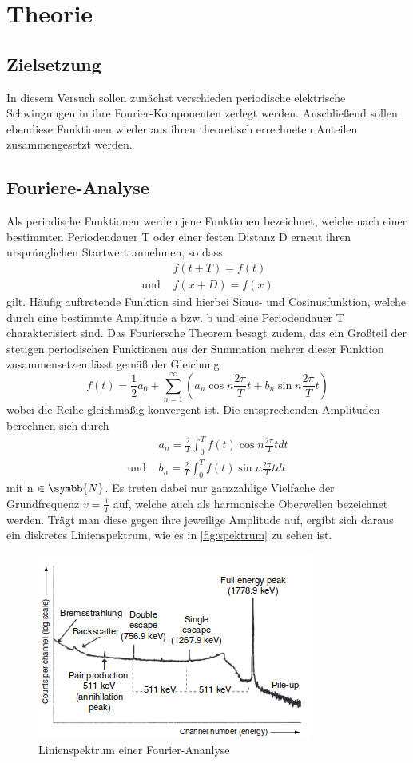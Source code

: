 \section{Theorie}
\label{sec:Theorie}
\subsection{Zielsetzung}
In diesem Versuch sollen zunächst verschieden periodische elektrische
Schwingungen in ihre Fourier-Komponenten zerlegt werden. Anschließend sollen
ebendiese Funktionen wieder aus ihren theoretisch errechneten Anteilen
zusammengesetzt werden.

\subsection{Fouriere-Analyse}
Als periodische Funktionen werden jene Funktionen bezeichnet, welche nach
einer bestimmten Periodendauer T oder einer festen Distanz D erneut ihren
ursprünglichen Startwert annehmen, so dass
\begin{align}
  & f(t+T)=f(t) \\
  \text{und    }      & f(x+D)=f(x)
  \label{eqn:period}
\end{align}
gilt. Häufig auftretende Funktion sind hierbei Sinus- und Cosinusfunktion,
welche durch eine bestimmte Amplitude a bzw. b und eine Periodendauer T
charakterisiert sind.
Das Fouriersche Theorem besagt zudem, das ein Großteil der stetigen periodischen
Funktionen aus der Summation mehrer dieser Funktion zusammensetzen lässt gemäß
der Gleichung
\begin{equation}
   f(t)= \frac{1}{2}a_0 + \sum_{n=1}^\infty (a_n \cos n \frac{2 \pi}{T}t
   + b_n \sin n \frac{2 \pi}{T}t)
\end{equation}
wobei die Reihe gleichmäßig konvergent ist. Die entsprechenden Amplituden
berechnen sich durch
\begin{align}
  & a_n = \frac{2}{T} \int_0^T f(t) \cos n \frac{2 \pi}{T}t dt \\
  \text{und    }     & b_n = \frac{2}{T} \int_0^T f(t) \sin n \frac{2 \pi}
  {T}t dt
\end{align}
mit n $\in \symbb{N} $. Es treten dabei nur ganzzahlige Vielfache der
Grundfrequenz $v = \frac{1}{T} $ auf, welche auch als harmonische Oberwellen
bezeichnet werden. Trägt man diese gegen ihre jeweilige Amplitude auf, ergibt
sich daraus ein diskretes Linienspektrum, wie es in \ref{fig:spektrum} zu
sehen ist.
\begin{figure}[H]
  \centering
  \includegraphics{Spektrum}
  \caption{Linienspektrum einer Fourier-Ananlyse \cite{skript}}
  \label{fig:Biegung}
\end{figure}
